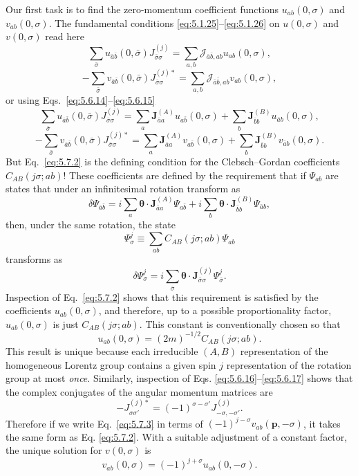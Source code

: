 Our first task is to find the zero-momentum coefficient functions
$u_{ab}(0,\sigma)$ and $v_{ab}(0,\sigma)$. The fundamental conditions
\eqref{eq:5.1.25}--\eqref{eq:5.1.26} on $u(0,\sigma)$ and $v(0,\sigma)$ read here
\[
\sum_{\bar\sigma}u_{\bar a\bar b}(0,\bar\sigma)
J^{(j)}_{\bar\sigma\sigma}
=\sum_{a,b}\mathcal J_{\bar a\bar b,ab}u_{ab}(0,\sigma),
\]
\[
-\sum_{\bar\sigma}v_{\bar a\bar b}(0,\bar\sigma)
J^{(j)*}_{\bar\sigma\sigma}
=\sum_{a,b}\mathcal J_{\bar a\bar b,ab}v_{ab}(0,\sigma),
\]
or using Eqs.~\eqref{eq:5.6.14}--\eqref{eq:5.6.15}
\begin{equation}
\sum_{\bar\sigma}u_{\bar a\bar b}(0,\bar\sigma)
J^{(j)}_{\bar\sigma\sigma}
=\sum_a\mathbf J^{(A)}_{\bar a a}u_{a\bar b}(0,\sigma)
+\sum_b\mathbf J^{(B)}_{\bar b b}u_{\bar a b}(0,\sigma),
\tag{5.7.2}\label{eq:5.7.2}
\end{equation}
\begin{equation}
-\sum_{\bar\sigma}v_{\bar a\bar b}(0,\bar\sigma)
J^{(j)*}_{\bar\sigma\sigma}
=\sum_a\mathbf J^{(A)}_{\bar a a}v_{a\bar b}(0,\sigma)
+\sum_b\mathbf J^{(B)}_{\bar b b}v_{\bar a b}(0,\sigma).
\tag{5.7.3}\label{eq:5.7.3}
\end{equation}
But Eq.~\eqref{eq:5.7.2} is the defining condition for the Clebsch--Gordan
coefficients $C_{AB}(j\sigma;ab)$! These coefficients are defined by the
requirement that if $\Psi_{ab}$ are states that under an infinitesimal rotation
transform as
\[
\delta\Psi_{\bar a\bar b}=i\sum_a\boldsymbol\theta\cdot
\mathbf J^{(A)}_{\bar a a}\Psi_{a\bar b}
+i\sum_b\boldsymbol\theta\cdot
\mathbf J^{(B)}_{\bar b b}\Psi_{\bar a b},
\]
then, under the same rotation, the state
\[
\Psi^j_\sigma\equiv\sum_{ab}C_{AB}(j\sigma;ab)\Psi_{ab}
\]
transforms as
\[
\delta\Psi^j_\sigma=i\sum_{\bar\sigma}\boldsymbol\theta\cdot
\mathbf J^{(j)}_{\bar\sigma\sigma}\Psi^j_{\bar\sigma}.
\]
Inspection of Eq.~\eqref{eq:5.7.2} shows that this requirement is satisfied by the
coefficients $u_{ab}(0,\sigma)$, and therefore, up to a possible
proportionality factor, $u_{ab}(0,\sigma)$ is just $C_{AB}(j\sigma;ab)$. This
constant is conventionally chosen so that
\begin{equation}
u_{ab}(0,\sigma)=(2m)^{-1/2}C_{AB}(j\sigma;ab).
\tag{5.7.4}\label{eq:5.7.4}
\end{equation}
This result is unique because each irreducible $(A,B)$ representation of the
homogeneous Lorentz group contains a given spin $j$ representation of the
rotation group at most \emph{once}. Similarly, inspection of Eqs.
\eqref{eq:5.6.16}--\eqref{eq:5.6.17} shows that the complex conjugates of the angular momentum
matrices are
\begin{equation}
-J^{(j)*}_{\sigma\sigma'}=(-1)^{\sigma-\sigma'}J^{(j)}_{-\sigma,-\sigma'}.
\tag{5.7.5}\label{eq:5.7.5}
\end{equation}
Therefore if we write Eq.~\eqref{eq:5.7.3} in terms of
$(-1)^{j-\sigma}v_{ab}(\mathbf p,-\sigma)$, it takes the same form as Eq.
\eqref{eq:5.7.2}. With a suitable adjustment of a constant factor, the unique solution
for $v(0,\sigma)$ is
\begin{equation}
v_{ab}(0,\sigma)=(-1)^{j+\sigma}u_{ab}(0,-\sigma).
\tag{5.7.6}\label{eq:5.7.6}
\end{equation}

